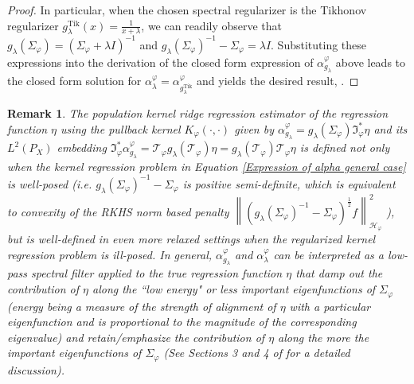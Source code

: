 \documentclass{article} %
\newcommand{\I}{\mathfrak{I}}
\newcommand{\rep}{\varphi}
\newcommand{\Hrep}{\mathcal{H}_{\varphi}}
\newcommand{\Srep}{\Sigma_{\rep}}
\newcommand{\Sreplambdainv}{(\Srep+\lambda I)^{-1}}
\newcommand{\Trep}{\mathcal{T}_{\rep}}
\newcommand{\Irep}{\I_{\rep}}
\newcommand{\Irepad}{\Irep^{*}}
\newcommand{\gl}{g_{\lambda}}
\newcommand{\glTik}{\gl^{\operatorname{Tik}}}
\newcommand{\norm}[1]{\left\|#1\right\|}
\newcommand{\LPtwo}{L^{2}(P_{X})}
\theoremstyle{plain}
\newcounter{remarkno}
\newtheorem{remark}[remarkno]{Remark}
\begin{document}
\begin{proof}
In particular, when the chosen spectral regularizer is the Tikhonov regularizer $\glTik(x) = \frac{1}{x+\lambda}$, we can readily observe that $\gl(\Srep) = \Sreplambdainv$ and $\gl(\Srep)^{-1} - \Srep = \lambda I$. Substituting these expressions into the derivation of the closed form expression of $\alpha_{\gl}^{\rep}$ above leads to the closed form solution for $\alpha_{\lambda}^{\rep} = \alpha_{\glTik}^{\rep}$ and yields the desired result, .    
\end{proof}

\begin{remark}\label{rem: low pass spcetral filer of regression function}
    The population kernel ridge regression estimator of the regression function $\eta$ using the pullback kernel $K_{\rep}(\cdot,\cdot)$ given by $\alpha_{\gl}^{\rep} = \gl(\Srep) \Irepad \eta$ and its $\LPtwo$ embedding $\Irepad \alpha_{\gl}^{\rep}=\Trep \gl(\Trep) \eta =  \gl(\Trep) \Trep \eta$ is defined not only when the kernel regression problem in Equation \ref{Expression of alpha general case} is well-posed \Big(i.e. $\gl(\Srep)^{-1} - \Srep$ is positive semi-definite, which is equivalent to convexity of the RKHS norm based penalty $\norm{(\gl(\Srep)^{-1} - \Srep)^{\frac{1}{2}}f}_{\Hrep}^{2}$ \Big), but is well-defined in even more relaxed settings when the regularized kernel regression problem is ill-posed. In general, $\alpha_{\gl}^{\rep}$ and $\alpha_{\lambda}^{\rep}$ can be interpreted as a low-pass spectral filter applied to the true regression function $\eta$ that damp out the contribution of $\eta$ along the ``low energy" or less important eigenfunctions of $\Srep$ (energy being a measure of the strength of alignment of $\eta$ with a particular eigenfunction and is proportional to the magnitude of the corresponding eigenvalue) and retain/emphasize the contribution of $\eta$ along the more the important eigenfunctions of $\Srep$ (See Sections 3 and 4 of \citet{SpecAlgGerfo2008}  for a detailed discussion).
\end{remark}
\end{document}
